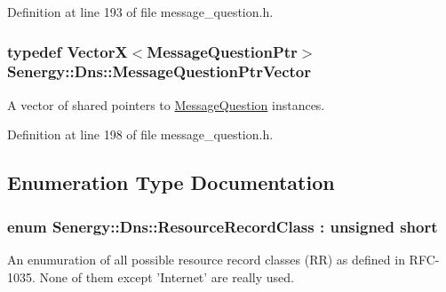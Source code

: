 Definition at line 193 of file message\-\_\-question.\-h.

\hypertarget{namespace_senergy_1_1_dns_a6983ff2422cfa510ca61831ae5cf1ffc}{
\subsubsection[{Message\-Question\-Ptr\-Vector}]{\setlength{\rightskip}{0pt plus 5cm}typedef {\bf Vector\-X}$<${\bf Message\-Question\-Ptr}$>$ {\bf Senergy\-::\-Dns\-::\-Message\-Question\-Ptr\-Vector}}}\label{namespace_senergy_1_1_dns_a6983ff2422cfa510ca61831ae5cf1ffc}


A vector of shared pointers to \hyperlink{class_senergy_1_1_dns_1_1_message_question}{Message\-Question} instances. 



Definition at line 198 of file message\-\_\-question.\-h.



\subsection{Enumeration Type Documentation}
\hypertarget{namespace_senergy_1_1_dns_a953f153bc411213d621d00c1e1b3eb9d}{
\subsubsection[{Resource\-Record\-Class}]{\setlength{\rightskip}{0pt plus 5cm}enum {\bf Senergy\-::\-Dns\-::\-Resource\-Record\-Class} \-: unsigned short\hspace{0.3cm}{\ttfamily [strong]}}}\label{namespace_senergy_1_1_dns_a953f153bc411213d621d00c1e1b3eb9d}


An enumuration of all possible resource record classes (R\-R) as defined in R\-F\-C-\/1035. None of them except 'Internet' are really used. 

